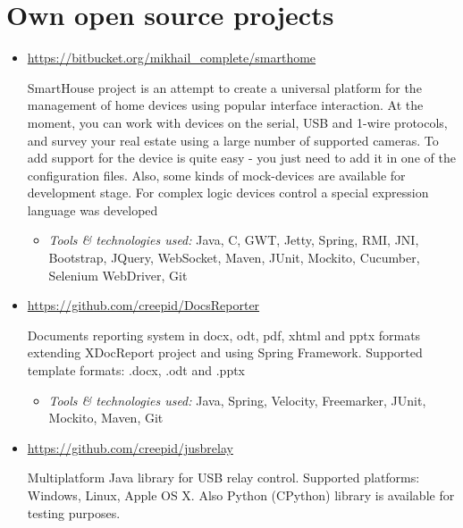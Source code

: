 \documentclass[a4paper, 12pt]{article}
\newcommand{\itemlabel}[1]{
    \textit{#1:}}
\begin{document}
\section*{Own open source projects}  

  
    \begin{itemize}
   
        \item \href{https://bitbucket.org/mikhail_complete/smarthome/src}{https://bitbucket.org/mikhail\_complete/smarthome}

            SmartHouse project is an attempt to create a universal platform for the management of home devices using popular interface interaction. At the moment, you can work with devices on the serial, USB and 1-wire protocols, and survey your real estate using a large number of supported cameras. To add support for the device is quite easy - you just need to add it in one of the configuration files. Also, some kinds of mock-devices are available for development stage.
            For complex logic devices control a special expression language was developed
                        
            \begin{itemize}
                \item \itemlabel{Tools \& technologies used} Java, C, GWT, Jetty, Spring, RMI, JNI, Bootstrap, JQuery, WebSocket, Maven, JUnit, Mockito, Cucumber, Selenium WebDriver, Git
            \end{itemize}
            

        \item \href{https://github.com/creepid/DocsReporter}{https://github.com/creepid/DocsReporter}

            Documents reporting system in docx, odt, pdf, xhtml and pptx formats extending XDocReport project and using Spring Framework.
Supported template formats: .docx, .odt and .pptx

            \begin{itemize}
                \item \itemlabel{Tools \& technologies used} Java, Spring, Velocity, Freemarker, JUnit, Mockito, Maven, Git
            \end{itemize}
            
              \item \href{https://github.com/creepid/jusbrelay}{https://github.com/creepid/jusbrelay}

            Multiplatform Java library for USB relay control. Supported platforms: Windows, Linux, Apple OS X. Also Python (CPython) library is available for testing purposes.


\end{itemize}
\end{document}
